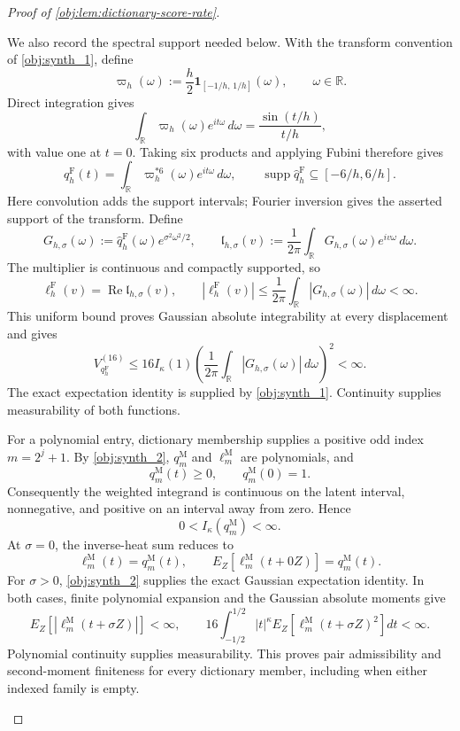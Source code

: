 \documentclass[11pt]{article}
\begin{document}
\begin{proof}[Proof of \cref{obj:lem:dictionary-score-rate}]
\begin{enumerate}
We also record the spectral support needed below. With the transform convention of \cref{obj:synth_1}, define
\[
\varpi_h(\omega):=\frac h2\mathbf1_{[-1/h,\,1/h]}(\omega),
\qquad \omega\in\mathbb R.
\]
Direct integration gives
\[
\int_{\mathbb R}\varpi_h(\omega)e^{it\omega}\,d\omega
=\frac{\sin(t/h)}{t/h},
\]
with value one at \(t=0\). Taking six products and applying Fubini therefore gives
\[
q_h^{\mathrm F}(t)
=\int_{\mathbb R}\varpi_h^{*6}(\omega)e^{it\omega}\,d\omega,
\qquad
\operatorname{supp}\widehat q_h^{\mathrm F}
\subseteq[-6/h,6/h].
\]
Here convolution adds the support intervals; Fourier inversion gives the asserted support of the transform. Define
\[
G_{h,\sigma}(\omega)
:=\widehat q_h^{\mathrm F}(\omega)e^{\sigma^2\omega^2/2},
\qquad
\mathfrak l_{h,\sigma}(v)
:=\frac1{2\pi}\int_{\mathbb R}G_{h,\sigma}(\omega)e^{iv\omega}\,d\omega.
\]
The multiplier is continuous and compactly supported, so
\[
\ell_h^{\mathrm F}(v)=\operatorname{Re}\mathfrak l_{h,\sigma}(v),
\qquad
|\ell_h^{\mathrm F}(v)|
\le\frac1{2\pi}\int_{\mathbb R}|G_{h,\sigma}(\omega)|\,d\omega<\infty.
\]
This uniform bound proves Gaussian absolute integrability at every displacement and gives
\[
V_{q_h^{\mathrm F}}^{(16)}
\le
16I_\kappa(1)
\left(\frac1{2\pi}\int_{\mathbb R}|G_{h,\sigma}(\omega)|\,d\omega\right)^2
<\infty.
\]
The exact expectation identity is supplied by \cref{obj:synth_1}. Continuity supplies measurability of both functions.

For a polynomial entry, dictionary membership supplies a positive odd index \(m=2^j+1\). By \cref{obj:synth_2}, \(q_m^{\mathrm M}\) and \(\ell_m^{\mathrm M}\) are polynomials, and
\[
q_m^{\mathrm M}(t)\ge0,
\qquad
q_m^{\mathrm M}(0)=1.
\]
Consequently the weighted integrand is continuous on the latent interval, nonnegative, and positive on an interval away from zero. Hence
\[
0<I_\kappa(q_m^{\mathrm M})<\infty.
\]
At \(\sigma=0\), the inverse-heat sum reduces to
\[
\ell_m^{\mathrm M}(t)=q_m^{\mathrm M}(t),
\qquad
E_Z[\ell_m^{\mathrm M}(t+0Z)]=q_m^{\mathrm M}(t).
\]
For \(\sigma>0\), \cref{obj:synth_2} supplies the exact Gaussian expectation identity. In both cases, finite polynomial expansion and the Gaussian absolute moments give
\[
E_Z\!\left[|\ell_m^{\mathrm M}(t+\sigma Z)|\right]<\infty,
\qquad
16\int_{-1/2}^{1/2}|t|^\kappa
E_Z\!\left[\ell_m^{\mathrm M}(t+\sigma Z)^2\right]dt<\infty.
\]
Polynomial continuity supplies measurability. This proves pair admissibility and second-moment finiteness for every dictionary member, including when either indexed family is empty.


\end{enumerate}
\end{proof}
\end{document}
